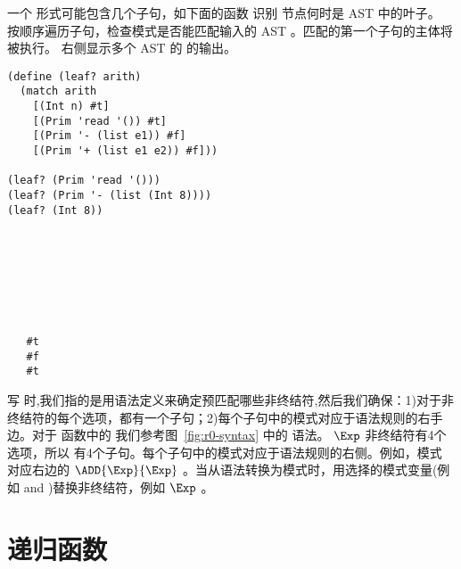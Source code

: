 \documentclass[11pt]{book}
\begin{document}
一个  形式可能包含几个子句，如下面的函数  识别 \LangInt{} 节点何时是 AST 中的叶子。  按顺序遍历子句，检查模式是否能匹配输入的 AST 。匹配的第一个子句的主体将被执行。 右侧显示多个 AST 的  的输出。
\begin{center}
\begin{minipage}{0.6\textwidth}
\begin{lstlisting}
(define (leaf? arith)
  (match arith
    [(Int n) #t]
    [(Prim 'read '()) #t]
    [(Prim '- (list e1)) #f]
    [(Prim '+ (list e1 e2)) #f]))

(leaf? (Prim 'read '()))
(leaf? (Prim '- (list (Int 8))))
(leaf? (Int 8))
\end{lstlisting}
\end{minipage}
\vrule
\begin{minipage}{0.25\textwidth}
  \begin{lstlisting}






    
   #t
   #f
   #t
\end{lstlisting}
\end{minipage}
\end{center}

写  时,我们指的是用语法定义来确定预匹配哪些非终结符,然后我们确保：1)对于非终结符的每个选项，都有一个子句；2)每个子句中的模式对应于语法规则的右手边。对于 函数中的 
我们参考图~\ref{fig:r0-syntax} 中的 \LangInt{} 语法。 $\Exp$ 非终结符有4个选项，所以  有4个子句。每个子句中的模式对应于语法规则的右侧。例如，模式  对应右边的 $\ADD{\Exp}{\Exp}$ 。当从语法转换为模式时，用选择的模式变量(例如 and )替换非终结符，例如 $\Exp$ 。


\section{递归函数}
\label{sec:recursion}
\end{document}
